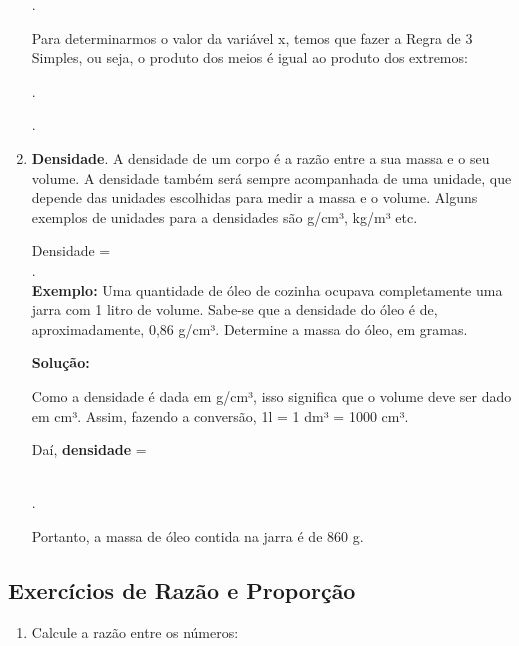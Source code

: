 \begin{multicols*}{2}
\begin{enumerate}
		      .

		      Para determinarmos o valor da variável x, temos que fazer a Regra de 3 Simples, ou seja, o produto dos meios é igual ao produto dos extremos:

		      .

		      .

		\item \textbf{Densidade}. A densidade de um corpo é a razão entre a sua massa e o seu volume. A densidade também será sempre acompanhada de uma unidade, que depende das unidades escolhidas para medir a massa e o volume. Alguns exemplos de unidades para a densidades são g/cm³, kg/m³ etc.

		      Densidade = \\

		      .\\

		      \textbf{Exemplo:} Uma quantidade de óleo de cozinha ocupava completamente uma jarra com 1 litro de volume. Sabe-se que a densidade do óleo é de, aproximadamente, 0,86 g/cm³.  Determine a massa do óleo, em gramas.

		      \textbf{Solução:}

		      Como a densidade é dada em g/cm³, isso significa que o volume deve ser dado em cm³. Assim, fazendo a conversão, 1l = 1 dm³ = 1000 cm³.

		      Daí, \textbf{densidade} =

		      \\

		      .

		      Portanto, a massa de óleo contida na jarra é de 860 g.

	\end{enumerate}

	\subsection{Exercícios de Razão e Proporção}

	\begin{enumerate}

		\item Calcule a razão entre os números:


\end{enumerate}
\end{multicols*}

